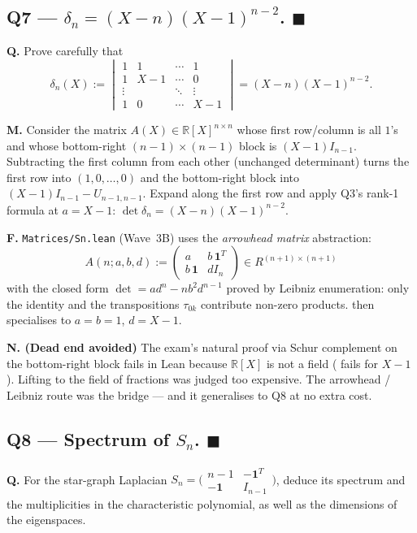 \documentclass[11pt,a4paper]{article}
\newcommand{\done}[1]{\textcolor{donegreen}{\textbf{#1}}}
\newcommand{\lmod}[1]{\texttt{\small #1}}
\newcommand{\R}{\mathbb{R}}
\theoremstyle{plain}
\theoremstyle{definition}
\begin{document}
\subsection{Q7 --- $\delta_n = (X-n)(X-1)^{n-2}$. \done{$\blacksquare$}}

\textbf{Q.} Prove carefully that
\[
\delta_n(X) := \begin{vmatrix}
1 & 1 & \cdots & 1 \\
1 & X{-}1 & \cdots & 0 \\
\vdots & & \ddots & \vdots \\
1 & 0 & \cdots & X{-}1
\end{vmatrix}
= (X-n)(X-1)^{n-2}.
\]

\textbf{M.} Consider the matrix $A(X) \in \R[X]^{n \times n}$ whose
first row/column is all $1$'s and whose bottom-right $(n-1)\times(n-1)$
block is $(X-1) I_{n-1}$. Subtracting the first column from each other
(unchanged determinant) turns the first row into $(1, 0, \ldots, 0)$
and the bottom-right block into $(X-1) I_{n-1} - U_{n-1,n-1}$. Expand
along the first row and apply Q3's rank-1 formula at $a = X - 1$:
$\det \delta_n = (X-n)(X-1)^{n-2}$.

\textbf{F.} \lmod{Matrices/Sn.lean} (Wave~3B) uses the
\emph{arrowhead matrix} abstraction:
\[
A(n; a, b, d) := \begin{pmatrix}a & b\,\mathbf 1^T\\ b\,\mathbf 1 & d I_n\end{pmatrix} \in R^{(n+1)\times(n+1)}
\]
with the closed form $\det = a d^n - n b^2 d^{n-1}$ proved by
Leibniz enumeration: only the identity and the transpositions
$\tau_{0k}$ contribute non-zero products.
 then specialises to $a = b = 1$, $d = X-1$.

\textbf{N. (Dead end avoided)} The exam's natural proof via Schur
complement on the bottom-right block fails in Lean because
$\R[X]$ is not a field ( fails for $X-1$).
Lifting to the field of fractions was judged too expensive.
The arrowhead / Leibniz route was the bridge --- and it
generalises to Q8 at no extra cost.

\subsection{Q8 --- Spectrum of $S_n$. \done{$\blacksquare$}}

\textbf{Q.} For the star-graph Laplacian
$S_n = \bigl(\begin{smallmatrix}n{-}1 & -\mathbf 1^T\\ -\mathbf 1 & I_{n-1}\end{smallmatrix}\bigr)$,
deduce its spectrum and the multiplicities in the characteristic
polynomial, as well as the dimensions of the eigenspaces.
\end{document}
